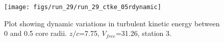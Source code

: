 \begin{figure}[H]
\centering
\texttt{[image: figs/run\_29/run\_29\_ctke\_05rdynamic]}
\caption{Plot showing dynamic variations in turbulent kinetic energy between 0 and 0.5 core radii. $z/c$=7.75, $V_{free}$=31.26, station 3.}
\label{fig:run_29_ctke_05rdynamic}
\end{figure}


